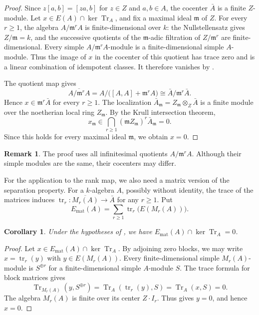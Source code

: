 \documentclass[11pt,letterpaper]{amsart}
\newtheorem{corollary}[theorem]{Corollary}
\theoremstyle{definition}
\newtheorem{remark}[theorem]{Remark}
\numberwithin{equation}{section}
\numberwithin{theorem}{section}
\let\ge\geqslant
\newcommand{\kk}{k}
\DeclareMathOperator{\Tr}{Tr}
\begin{document}
\begin{proof}
Since $z[a,b]=[za,b]$ for $z\in Z$ and $a,b\in A$,
the cocenter $\bar A$ is a finite $Z$-module.
Let $x\in E(A)\cap\ker\Tr_A$, and fix a maximal ideal
$\mathfrak m$ of $Z$. For every $r\ge1$, the algebra
$A/\mathfrak m^rA$ is finite-dimensional over $\kk$:
the Nullstellensatz gives $Z/\mathfrak m=\kk$, and the
successive quotients of the $\mathfrak m$-adic filtration
of $Z/\mathfrak m^r$ are finite-dimensional.
Every simple $A/\mathfrak m^rA$-module is a
finite-dimensional simple $A$-module. Thus the image of $x$ in the cocenter of this quotient has trace zero and is a linear combination of idempotent classes. It therefore vanishes by .

The quotient map gives
\[
 \overline{A/\mathfrak m^rA}
   =A/\bigl([A,A]+\mathfrak m^rA\bigr)
   \cong\bar A/\mathfrak m^r\bar A.
\]
Hence $x\in\mathfrak m^r\bar A$ for every $r\ge1$.
The localization $\bar A_{\mathfrak m}
=Z_{\mathfrak m}\otimes_Z\bar A$ is a finite module over
the noetherian local ring $Z_{\mathfrak m}$. By the Krull
intersection theorem,
\[
 x_{\mathfrak m}\in
 \bigcap_{r\ge1}(\mathfrak mZ_{\mathfrak m})^r
                         \bar A_{\mathfrak m}=0.
\]
Since this holds for every maximal ideal $\mathfrak m$,
we obtain $x=0$.
\end{proof}

\begin{remark}\label{rem:thickenings}
The proof uses all infinitesimal quotients $A/\mathfrak m^rA$.
Although their simple modules are the same, their cocenters
may differ.
\end{remark}

For the application to the rank map, we also need a matrix version of the separation property. For a $\kk$-algebra $A$, possibly without identity, the trace of the matrices induces $\operatorname{tr}_r:\overline{M_r(A)}\to\bar A$ for any $r\ge1$. Put
\[
 E_{\mathrm{mat}}(A)
   =\sum_{r\ge1}\operatorname{tr}_r\bigl(E(M_r(A))\bigr).
\]

\begin{corollary}\label{cor:matrix-separation}
Under the hypotheses of , we have
$E_{\mathrm{mat}}(A)\cap\ker\Tr_A=0$.
\end{corollary}

\begin{proof}
Let $x \in E_{\mathrm{mat}}(A)\cap\ker\Tr_A$. By adjoining zero blocks, we may write $x=\operatorname{tr}_r(y)$ with $y\in E(M_r(A))$. Every finite-dimensional simple
$M_r(A)$-module is $S^{\oplus r}$ for a finite-dimensional
simple $A$-module $S$. The trace formula for block matrices gives
\[
 \Tr_{M_r(A)}(y,S^{\oplus r})
   =\Tr_A(\operatorname{tr}_r(y),S)
   =\Tr_A(x,S)=0.
\] The algebra $M_r(A)$ is finite over its
center $Z\cdot I_r$. Thus  gives
$y=0$, and hence $x=0$.
\end{proof}
\end{document}
